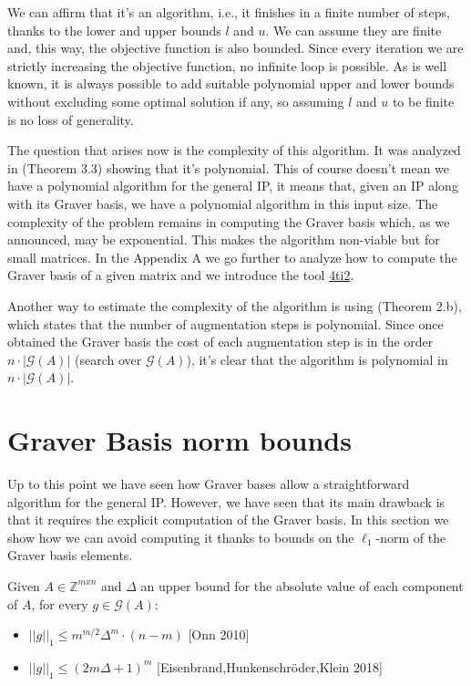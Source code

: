 We can affirm that it's an algorithm, i.e., it finishes in a finite number of steps, thanks to the lower and upper bounds $l$ and $u$. We can assume they are finite and, this way, the objective function is also bounded. Since every iteration we are strictly increasing the objective function, no infinite loop is possible. As is well known, it is always possible to add suitable polynomial upper and lower bounds without excluding some optimal solution if any, so assuming $l$ and $u$ to be finite is no loss of generality.

The question that arises now is the complexity of this algorithm. It was analyzed in \cite{LHOW:2006} (Theorem 3.3) showing that it's polynomial. This of course doesn't mean we have a polynomial algorithm for the general IP, it means that, given an IP along with its Graver basis, we have a polynomial algorithm in this input size. The complexity of the problem remains in computing the Graver basis which, as we announced, may be exponential. This makes the algorithm non-viable but for small matrices. In the Appendix A we go further to analyze how to compute the Graver basis of a given matrix and we introduce the tool \href{https://4ti2.github.io/}{4ti2}.

Another way to estimate the complexity of the algorithm is using \cite{HOW:2009} (Theorem 2.b), which states that the number of augmentation steps is polynomial. Since once obtained the Graver basis the cost of each augmentation step is in the order $n \cdot |\mathcal{G}(A)|$ (search over $\mathcal{G}(A)$), it's clear that the algorithm is polynomial in $n \cdot |\mathcal{G}(A)|$.



\section{Graver Basis norm bounds}

Up to this point we have seen how Graver bases allow a straightforward algorithm for the general IP. However, we have seen that its main drawback is that it requires the explicit computation of the Graver basis. In this section we show how we can avoid computing it thanks to bounds on the $\ell_1$-norm of the Graver basis elements.

\begin{proposition}
Given $A \in \mathbb{Z}^{mxn}$ and $\Delta$ an upper bound for the absolute value of each component of $A$, for every $g \in \mathcal{G}(A)$:
\vspace{-10pt}
\begin{itemize}
    \item $||g||_1 \leq m^{m/2}\Delta^m\cdot(n - m)$ \hspace{10pt}[Onn 2010]
    \item $||g||_1 \leq (2m \Delta + 1)^m$ \hspace{41pt}[Eisenbrand,Hunkenschröder,Klein 2018]
\end{itemize}
\end{proposition}

